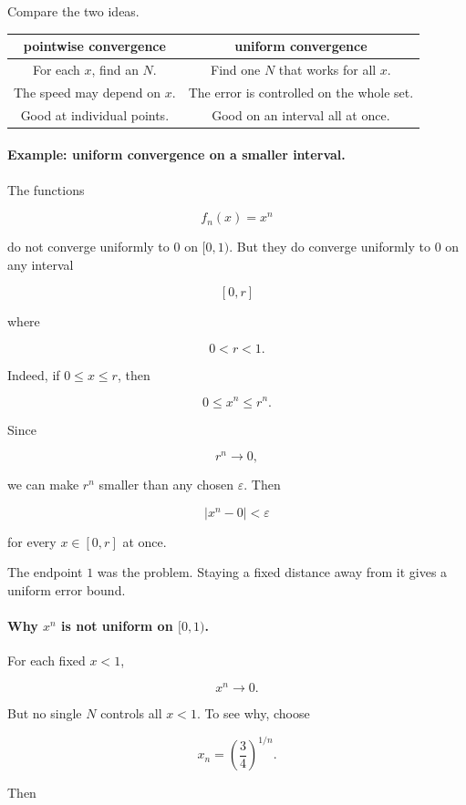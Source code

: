 Compare the two ideas.

\begin{center}
\renewcommand{\arraystretch}{1.4}
\begin{tabular}{c|c}
\textbf{pointwise convergence} & \textbf{uniform convergence} \\ \hline
For each \(x\), find an \(N\). & Find one \(N\) that works for all \(x\). \\
The speed may depend on \(x\). & The error is controlled on the whole set. \\
Good at individual points. & Good on an interval all at once.
\end{tabular}
\end{center}

\paragraph{Example: uniform convergence on a smaller interval.}
The functions

\[
f_n(x)=x^n
\]

do not converge uniformly to \(0\) on \([0,1)\).  But they do converge uniformly to \(0\)
on any interval

\[
[0,r]
\]

where

\[
0<r<1.
\]

Indeed, if \(0\le x\le r\), then

\[
0\le x^n\le r^n.
\]

Since

\[
r^n\to0,
\]

we can make \(r^n\) smaller than any chosen \(\varepsilon\).  Then

\[
|x^n-0|<\varepsilon
\]

for every \(x\in[0,r]\) at once.

The endpoint \(1\) was the problem.  Staying a fixed distance away from it gives a
uniform error bound.

\paragraph{Why \(x^n\) is not uniform on \([0,1)\).}
For each fixed \(x<1\),

\[
x^n\to0.
\]

But no single \(N\) controls all \(x<1\).  To see why, choose

\[
x_n=\left(\frac34\right)^{1/n}.
\]

Then

